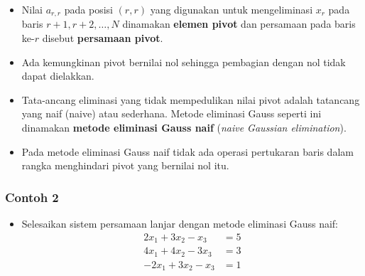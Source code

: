 \documentclass[pdflatex,compress,mathserif]{beamer}
\begin{document}
\begin{frame}
	\begin{itemize}
		\item Nilai $ a_{r, r} $ pada posisi $ (r, r) $ yang digunakan untuk mengeliminasi $ x_r $ pada baris $ r + 1, r + 2, \dots, N $ dinamakan \textbf{elemen pivot} dan persamaan pada baris ke-$ r $ disebut \textbf{persamaan pivot}.
		\item Ada kemungkinan pivot bernilai nol sehingga pembagian dengan nol tidak dapat dielakkan.
		\item Tata-ancang eliminasi yang tidak mempedulikan nilai pivot adalah tatancang yang naif (naive) atau sederhana. Metode eliminasi Gauss seperti ini dinamakan \textbf{metode eliminasi Gauss naif} (\textit{naive Gaussian elimination}).
		\item Pada metode eliminasi Gauss naif tidak ada operasi pertukaran baris dalam rangka menghindari pivot yang bernilai nol itu.
	\end{itemize}
\end{frame}

\begin{frame}
	\frametitle{Contoh 2}
	\begin{itemize}
		\item Selesaikan sistem persamaan lanjar dengan metode eliminasi Gauss naif:
		\begin{align*}
			2x_1 + 3x_2 - x_3 &= 5 \\
			4x_1 + 4x_2 - 3x_3 &= 3 \\
			-2x_1 + 3x_2 - x_3 &= 1
		\end{align*}
	\end{itemize}
\end{frame}
\end{document}
